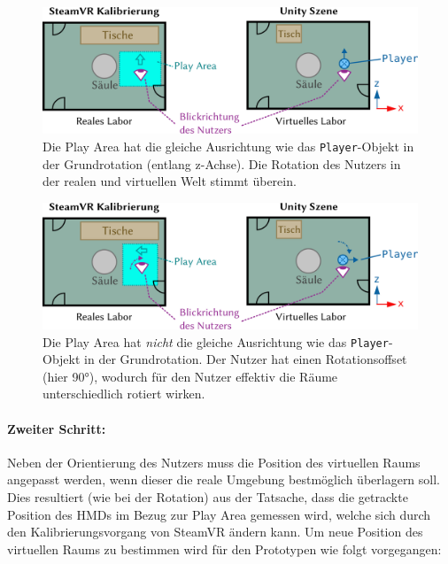 \begin{figure}
    \includegraphics[width=\textwidth]{figures/environment_setup_correct}
    \caption{Die Play Area hat die gleiche Ausrichtung wie das \lstinline{Player}-Objekt in der Grundrotation (entlang z-Achse). %
    Die Rotation des Nutzers in der realen und virtuellen Welt stimmt überein.}
    \label{fig:ve_setup_correct}
\end{figure}

\begin{figure}
    \includegraphics[width=\textwidth]{figures/environment_setup_wrong}
    \caption{Die Play Area hat \emph{nicht} die gleiche Ausrichtung wie das \lstinline{Player}-Objekt in der Grundrotation. %
        Der Nutzer hat einen Rotationsoffset (hier \ang[detect-weight=true]{90}), wodurch für den Nutzer effektiv die Räume unterschiedlich rotiert wirken.}
    \label{fig:ve_setup_wrong}
\end{figure}

\paragraph{Zweiter Schritt:}
Neben der Orientierung des Nutzers muss die Position des virtuellen Raums angepasst werden, wenn dieser die reale Umgebung bestmöglich überlagern soll.
Dies resultiert (wie bei der Rotation) aus der Tatsache, dass die getrackte Position des HMDs im Bezug zur Play Area gemessen wird, welche sich durch den Kalibrierungsvorgang von SteamVR ändern kann.
Um neue Position des virtuellen Raums zu bestimmen wird für den Prototypen wie folgt vorgegangen:


